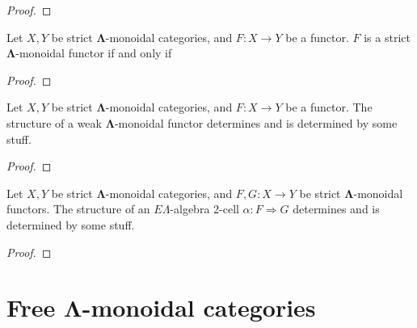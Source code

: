 \documentclass{amsbook} %
\newcommand{\ML}{\mathbf{\Lambda}}
\newcommand{\EL}{E\Lambda}
\numberwithin{section}{chapter}
\begin{document}
\begin{proof}
\end{proof}

\begin{prop}\label{el_strictmap}
Let $X,Y$ be strict $\ML$-monoidal categories, and $F \colon X \rightarrow Y$ be a functor. $F$ is a strict $\ML$-monoidal functor if and only if
\end{prop}
\begin{proof}

\end{proof}

\begin{prop}\label{el_weakmap}
Let $X,Y$ be strict $\ML$-monoidal categories, and $F \colon X \rightarrow Y$ be a functor. The structure of a weak $\ML$-monoidal functor determines and is determined by some stuff.
\end{prop}
\begin{proof}

\end{proof}

\begin{prop}\label{el_2cells}
Let $X,Y$ be strict $\ML$-monoidal categories, and $F, G \colon X \rightarrow Y$ be strict $\ML$-monoidal functors. The structure of an $\EL$-algebra 2-cell $\alpha \colon F \Rightarrow G$ determines and is determined by some stuff.
\end{prop}
\begin{proof}

\end{proof}

\section{Free $\ML$-monoidal categories}
\end{document}
